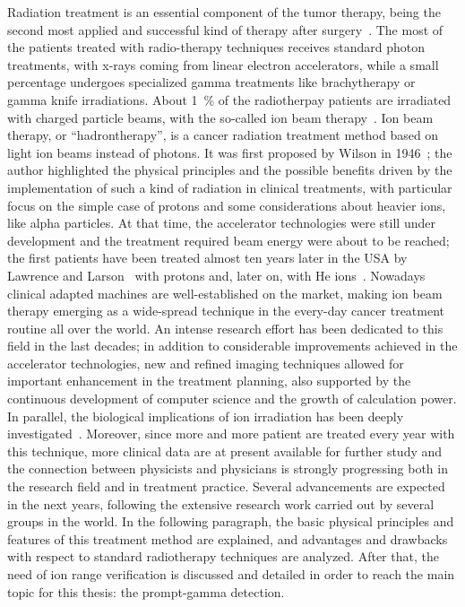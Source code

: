 Radiation treatment is an essential component of the tumor therapy, being the second most applied and successful kind of therapy after surgery~\parencite{Schardt2010}. The most of the patients treated with radio-therapy techniques receives standard photon treatments, with x-rays coming from linear electron accelerators, while a small percentage undergoes specialized gamma treatments like brachytherapy or gamma knife irradiations. About 1~\% of the radiotherpay patients are irradiated with charged particle beams, with the so-called ion beam therapy~\parencite{Durante2016}.
Ion beam therapy, or \enquote{hadrontherapy}, is a cancer radiation treatment method based on light ion beams instead of photons. It was first proposed by Wilson in 1946~\parencite{Wilson1946}; the author highlighted the physical principles and the possible benefits driven by the implementation of such a kind of radiation in clinical treatments, with particular focus on the simple case of protons and some considerations about heavier ions, like alpha particles. At that time, the accelerator technologies were still under development and the treatment required beam energy were about to be reached; the first patients have been treated almost ten years later in the USA by Lawrence and Larson~\parencite{Tobias1955, Tobias1958} with protons and, later on, with He ions~\parencite{Halperin2006}. Nowadays clinical adapted machines are well-established on the market, making ion beam therapy emerging as a wide-spread technique in the every-day cancer treatment routine all over the world. An intense research effort has been dedicated to this field in the last decades; in addition to considerable improvements achieved in the accelerator technologies, new and refined imaging techniques allowed for important enhancement in the treatment planning, also supported by the continuous development of computer science and the growth of calculation power. In parallel, the biological implications of ion irradiation has been deeply investigated~\parencite{Tobias1982, Brahme2004, Friedrich2012, }. Moreover, since more and more patient are treated every year with this technique, more clinical data are at present available for further study and the connection between physicists and physicians is strongly progressing both in the research field and in treatment practice. Several advancements are expected in the next years, following the extensive research work carried out by several groups in the world. In the following paragraph, the basic physical principles and features of this treatment method are explained, and advantages and drawbacks with respect to standard radiotherapy techniques are analyzed. After that, the need of ion range verification is discussed and detailed in order to reach the main topic for this thesis: the prompt-gamma detection.   

